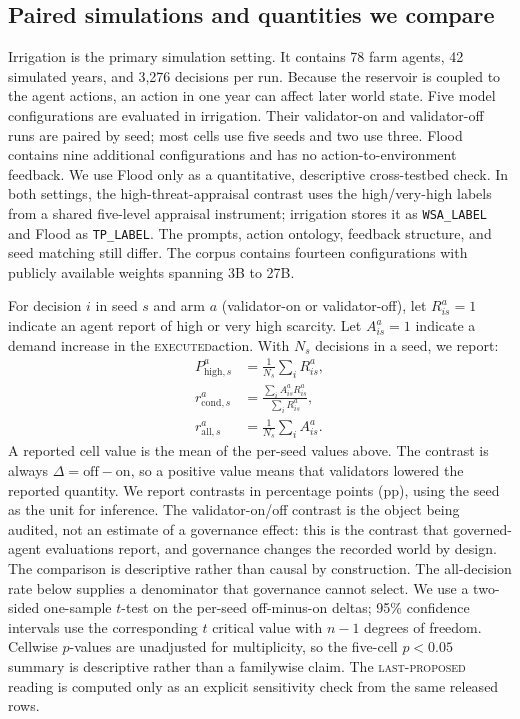 \documentclass{article}
\newcommand{\lastproposed}{\textsc{last-proposed}}
\newcommand{\executed}{\textsc{executed}}
\begin{document}
\subsection{Paired simulations and quantities we compare}

Irrigation is the primary simulation setting. It contains 78 farm agents, 42 simulated years, and 3,276 decisions per run. Because the reservoir is coupled to the agent actions, an action in one year can affect later world state. Five model configurations are evaluated in irrigation. Their validator-on and validator-off runs are paired by seed; most cells use five seeds and two use three. Flood contains nine additional configurations and has no action-to-environment feedback. We use Flood only as a quantitative, descriptive cross-testbed check. In both settings, the high-threat-appraisal contrast uses the high/very-high labels from a shared five-level appraisal instrument; irrigation stores it as \texttt{WSA\_LABEL} and Flood as \texttt{TP\_LABEL}. The prompts, action ontology, feedback structure, and seed matching still differ. The corpus contains fourteen configurations with publicly available weights spanning 3B to 27B.

For decision $i$ in seed $s$ and arm $a$ (validator-on or validator-off), let $R_{is}^a=1$ indicate an agent report of high or very high scarcity. Let $A_{is}^a=1$ indicate a demand increase in the \executed action. With $N_s$ decisions in a seed, we report:
\begin{align}
    P_{\mathrm{high},s}^a &= \frac{1}{N_s}\sum_i R_{is}^a,\\
    r_{\mathrm{cond},s}^a &= \frac{\sum_i A_{is}^a R_{is}^a}{\sum_i R_{is}^a},\\
    r_{\mathrm{all},s}^a &= \frac{1}{N_s}\sum_i A_{is}^a.
\end{align}
A reported cell value is the mean of the per-seed values above. The contrast is always $\Delta=\text{off}-\text{on}$, so a positive value means that validators lowered the reported quantity. We report contrasts in percentage points (pp), using the seed as the unit for inference. The validator-on/off contrast is the object being audited, not an estimate of a governance effect: this is the contrast that governed-agent evaluations report, and governance changes the recorded world by design. The comparison is descriptive rather than causal by construction. The all-decision rate below supplies a denominator that governance cannot select. We use a two-sided one-sample $t$-test on the per-seed off-minus-on deltas; 95\% confidence intervals use the corresponding $t$ critical value with $n-1$ degrees of freedom. Cellwise $p$-values are unadjusted for multiplicity, so the five-cell $p<0.05$ summary is descriptive rather than a familywise claim. The \lastproposed{} reading is computed only as an explicit sensitivity check from the same released rows.
\end{document}
